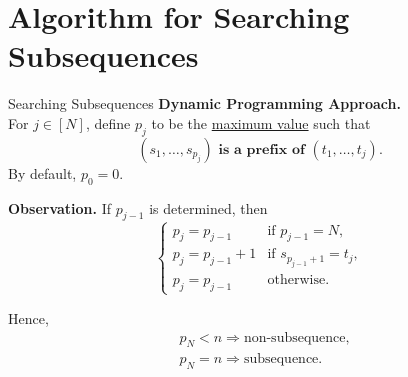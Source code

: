 \section{Algorithm for Searching Subsequences}
\begin{frame}{Searching Subsequences}
	\textbf{Dynamic Programming Approach.} \\
	For $j \in [N]$, define $p_j$ to be the \underline{maximum value} such that 
	\begin{equation*}
		\textbf{$(s_1, \dots, s_{p_j})$ is a prefix of $(t_1, \dots, t_j)$.}
	\end{equation*}
	By default, $p_0 = 0$.
	
	\textbf{Observation.} If $p_{j - 1}$ is determined, then
	\begin{equation*}
		\begin{cases}
			p_j = p_{j - 1} &\text{if $p_{j - 1} = N$},\\
			p_j = p_{j - 1} + 1 &\text{if $s_{p_{j - 1} + 1} = t_j$},\\
			p_j = p_{j - 1} &\text{otherwise}.
		\end{cases}
	\end{equation*}
	
	Hence,
	\begin{equation*}
		\begin{aligned}
			&p_N < n \Rightarrow \text{non-subsequence},\\
			&p_N = n \Rightarrow \text{subsequence}.
		\end{aligned}
	\end{equation*}
\end{frame}